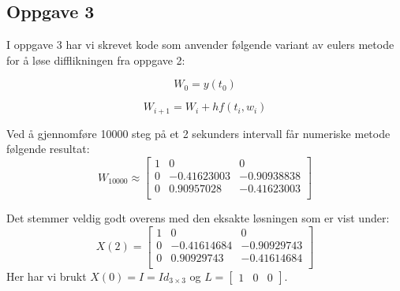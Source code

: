\subsection{Oppgave 3}
\label{section:oppgave3}
I oppgave 3 har vi skrevet kode som anvender følgende variant av eulers metode for å løse difflikningen fra oppgave 2:

\begin{equation}
    W_0 = y(t_0)
\end{equation}

\begin{equation}
    W_{i+1} = W_i + hf(t_i, w_i)
\end{equation}

Ved å gjennomføre 10000 steg på et 2 sekunders intervall får numeriske metode følgende resultat:\newline
\begin{equation}
W_{10000} \approx    
\begin{bmatrix}
1 & 0 & 0\\
0 & -0.41623003 & -0.90938838\\
0 & 0.90957028 & -0.41623003\\
\end{bmatrix}
\end{equation}

Det stemmer veldig godt overens med den eksakte løsningen som er vist under:\newline
\begin{equation}
X(2) =     
\begin{bmatrix}
1 & 0 & 0\\
0 & -0.41614684 & -0.90929743\\
0 & 0.90929743 & -0.41614684\\
\end{bmatrix}
\end{equation}
Her har vi brukt $X(0)=I=Id_{3\times3}$ og $L=\begin{bmatrix}1&0&0\end{bmatrix}.$
